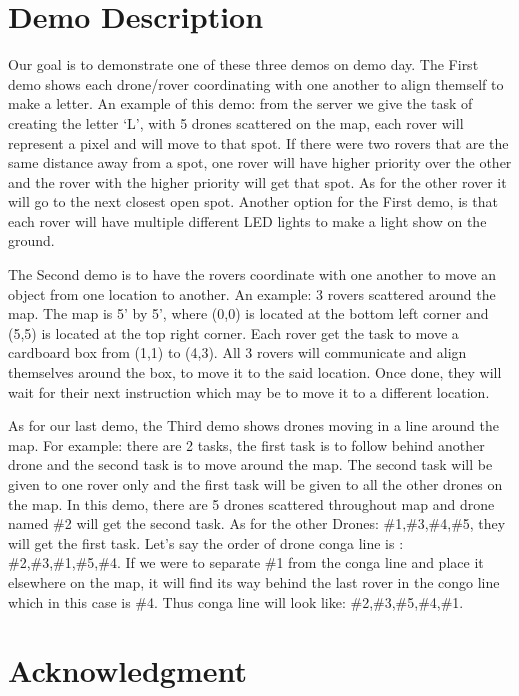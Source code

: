 \documentclass[conference]{IEEEtran}
\begin{document}
\section{Demo Description} 
Our goal is to demonstrate one of these three demos on demo day. The First demo shows each drone/rover coordinating with one another to align themself to make a letter. An example of this demo: from the server we give the task of creating the letter ‘L’, with 5 drones scattered on the map, each rover will represent a pixel and will move to that spot. If there were two rovers that are the same distance away from a spot, one rover will have higher priority over the other and the rover with the higher priority will get that spot. As for the other rover it will go to the next closest open spot. Another option for the First demo, is that each rover will have multiple different LED lights to make a light show on the ground.

The Second demo is to have the rovers coordinate with one another to move an object from one location to another. An example: 3 rovers scattered around the map. The map is 5’ by 5’, where (0,0) is located at the bottom left corner and (5,5) is located at the top right corner. Each rover get the task to move a cardboard box from (1,1) to (4,3). All 3 rovers will communicate and align themselves around the box, to move it to the said location. Once done, they will wait for their next instruction which may be to move it to a different location. 

As for our last demo, the Third demo shows drones moving in a line around the map. For example: there are 2 tasks, the first task is to follow behind another drone and the second task is to move around the map. The second task will be given to one rover only and the first task will be given to all the other drones on the map. In this demo, there are 5 drones scattered throughout map and drone named \#2 will get the second task. As for the other Drones: \#1,\#3,\#4,\#5, they will get the first task. Let’s say the order of drone conga line is : \#2,\#3,\#1,\#5,\#4. If we were to separate \#1 from the conga line and place it elsewhere on the map, it will find its way behind the last rover in the congo line which in this case is \#4. Thus conga line will look like: \#2,\#3,\#5,\#4,\#1.

\section*{Acknowledgment}
\end{document}
